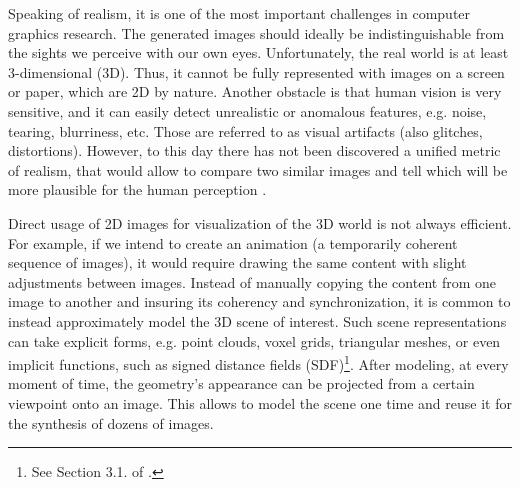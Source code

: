Speaking of realism, it is one of the most important challenges in computer graphics research. The generated images should ideally be indistinguishable from the sights we perceive with our own eyes. Unfortunately, the real world is at least 3-dimensional (3D). Thus, it cannot be fully represented with images on a screen or paper, which are 2D by nature. Another obstacle is that human vision is very sensitive, and it can easily detect unrealistic or anomalous features, e.g. noise, tearing, blurriness, etc. Those are referred to as visual artifacts (also glitches, distortions). However, to this day there has not been discovered a unified metric of realism, that would allow to compare two similar images and tell which will be more plausible for the human perception \cite{metric:wang11}.

Direct usage of 2D images for visualization of the 3D world is not always efficient. For example, if we intend to create an animation (a temporarily coherent sequence of images), it would require drawing the same content with slight adjustments between images. Instead of manually copying the content from one image to another and insuring its coherency and synchronization, it is common to instead approximately model the 3D scene of interest. Such scene representations can take explicit forms, e.g. point clouds, voxel grids, triangular meshes, or even implicit functions, such as signed distance fields (SDF)\cite{survey:advances-nn22}\footnote{See Section 3.1. of \cite{survey:advances-nn22}.}\label{intro:3d-representations-paragraph}. After modeling, at every moment of time, the geometry's appearance can be projected from a certain viewpoint onto an image. This allows to model the scene one time and reuse it for the synthesis of dozens of images.


